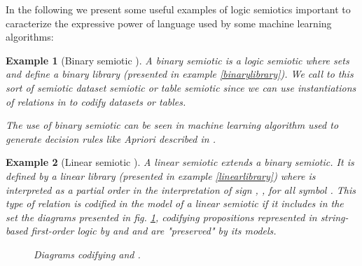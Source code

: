 \documentclass[oribibl]{llncs}
\newtheorem{exam}{Example}
\begin{document}
In the following we present some useful examples of logic semiotics important to caracterize the expressive power of language used by some machine learning algorithms:
\begin{exam}[Binary semiotic ]
A binary semiotic is a logic semiotic where sets  and  define a binary library  (presented in example \ref{binarylibrary}). We call to this sort of semiotic dataset semiotic or table semiotic since we can use instantiations of relations in  to codify datasets or tables.

The use of binary semiotic can be seen in machine learning algorithm used to generate decision rules like Apriori described in \cite{Michell86}.
\end{exam}

\begin{exam}[Linear semiotic ]
A linear semiotic  extends a binary semiotic. It is defined by a linear library  (presented in example \ref{linearlibrary}) where  is interpreted as a partial
order in the interpretation of sign , , for all symbol . This type of relation is codified in the model of a linear
semiotic  if it includes in the set  the diagrams
presented in fig. \ref{linear}, codifying propositions represented in string-based first-order logic by  and  and are "preserved" by its models.
\begin{figure}[h]

\caption{Diagrams codifying  and .}\label{linear}
\end{figure}


\end{exam}
\end{document}
